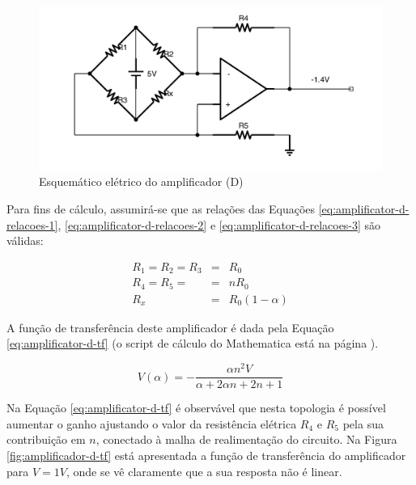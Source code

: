 \documentclass[a4paper]{instrumentacao}
\begin{document}
\begin{figure}[H]
\center
\includegraphics[width=\textwidth]{Amplificador-D.pdf}
\caption{Esquemático elétrico do amplificador (D)}
\label{fig:amplificador-d}
\end{figure}

Para fins de cálculo, assumirá-se que as relações das Equações \ref{eq:amplificator-d-relacoes-1}, \ref{eq:amplificator-d-relacoes-2} e \ref{eq:amplificator-d-relacoes-3} são válidas:

\begin{eqnarray}
	R_1 = R_2 = R_3 &=& R_0 \label{eq:amplificator-d-relacoes-1} \\
	R_4 = R_5 = &=& n R_0 		\label{eq:amplificator-d-relacoes-2} \\
	R_x &=& R_0(1-\alpha) 	\label{eq:amplificator-d-relacoes-3} 
\end{eqnarray}

A função de transferência deste amplificador é dada pela Equação \ref{eq:amplificator-d-tf} (o script de cálculo do Mathematica está na página \pageref{att:amplificadores}).

\begin{equation}
	V(\alpha) = -\frac{\alpha  n^2 V}{\alpha +2 \alpha  n+2 n+1}
	\label{eq:amplificator-d-tf}
\end{equation}

Na Equação \ref{eq:amplificator-d-tf} é observável que nesta topologia é possível aumentar o ganho ajustando o valor da resistência elétrica $R_4$ e $R_5$ pela sua contribuição em $n$, conectado à malha de realimentação do circuito. Na Figura \ref{fig:amplificador-d-tf} está apresentada a função de transferência do amplificador para $V=1V$, onde se vê claramente que a sua resposta não é linear.
\end{document}
